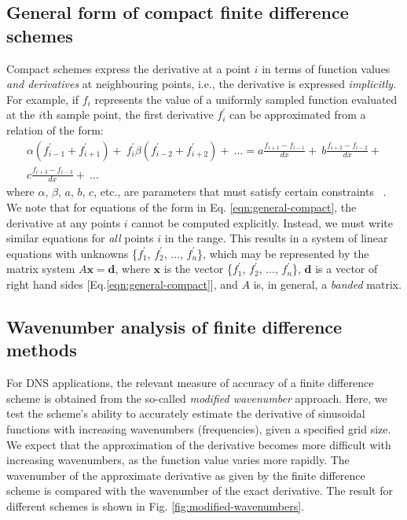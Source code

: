 \subsection{General form of compact finite difference schemes}
\label{subsec:gen-form-compact}

Compact schemes express the derivative at a point $i$
in terms of
function values \emph{and derivatives}
at neighbouring points,
i.e., the derivative is expressed \emph{implicitly}.
For example,
if $f_i$ represents the value of
a uniformly sampled function evaluated at the $i$th sample point,
the first derivative $f^{\prime}_i$ can be approximated from
a relation of the form:
%
\begin{equation}
\begin{split}
    \alpha(f^{\prime}_{i-1} + f^{\prime}_{i+1}) + \
        f^{\prime}_i
    \beta(f^{\prime}_{i-2} + f^{\prime}_{i+2}) + \
    \hdots
    = 
    a\frac{f_{i+1} - f_{i-1}}{dx} + \
    b\frac{f_{i+2} - f_{i-2}}{dx} + \\
    c\frac{f_{i+3} - f_{i-3}}{dx} + \
    \hdots
\end{split}
\label{eqn:general-compact}
\end{equation}
%
where $\alpha$, $\beta$, $a$, $b$, $c$, etc.,
are parameters that must satisfy certain constraints ~\cite{lele1992compact}.
We note that for equations of the form in Eq. \ref{eqn:general-compact},
the derivative at any points $i$ cannot be computed explicitly.
Instead, we must write similar equations for \emph{all} points $i$
in the range.
This results in a system of linear equations
with unknowns \{$f^{\prime}_1$, $f^{\prime}_2$, $\hdots$, $f^{\prime}_n$\},
which may be represented by the matrix system $A\bm{x}=\bm{d}$,
where $\bm{x}$ is the vector
\{$f^{\prime}_1$, $f^{\prime}_2$, $\hdots$, $f^{\prime}_n$\},
$\bm{d}$ is a vector of right hand sides [Eq.\ref{eqn:general-compact}],
and $A$ is, in general, a \emph{banded} matrix.

\subsection{Wavenumber analysis of finite difference methods}
\label{subsec:wavenumber-analysis}

For DNS applications, the relevant measure of accuracy of a
finite difference scheme is obtained from the so-called
\emph{modified wavenumber} approach.
Here, we test the scheme's ability to
accurately estimate the derivative of sinusoidal functions
with increasing wavenumbers (frequencies),
given a specified grid size. 
We expect that the approximation of the derivative
becomes more difficult with increasing wavenumbers,
as the function value varies more rapidly.
The wavenumber of the approximate derivative
as given by the finite difference scheme is compared with
the wavenumber of the exact derivative.
The result for different schemes is shown
in Fig. \ref{fig:modified-wavenumbers}.

